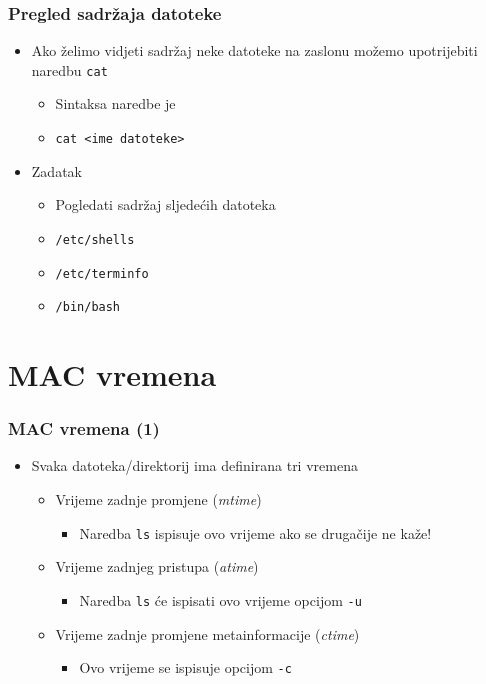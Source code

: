 \documentclass{beamer}
\newcommand{\shell}[1]{\texttt{#1}}
\begin{document}
\begin{frame}[t]
\frametitle{Pregled sadržaja datoteke}
\begin{itemize}
  \item Ako želimo vidjeti sadržaj neke datoteke na zaslonu možemo
        upotrijebiti naredbu \shell{cat}
  \begin{itemize}
    \item Sintaksa naredbe je 
    \item[] \shell{cat \textless ime datoteke\textgreater}
  \end{itemize}
  \item Zadatak
  \begin{itemize}
    \item Pogledati sadržaj sljedećih datoteka
    \item[] \shell{/etc/shells}
    \item[] \shell{/etc/terminfo}
    \item[] \shell{/bin/bash}
  \end{itemize}
\end{itemize}
\end{frame}

\section{MAC vremena}
\begin{frame}[t]
\frametitle{MAC vremena (1)}
\begin{itemize}
  \item Svaka datoteka/direktorij ima definirana tri vremena
  \begin{itemize}
    \item Vrijeme zadnje promjene (\emph{mtime})
    \begin{itemize}
      \item Naredba \shell{ls} ispisuje ovo vrijeme ako se drugačije 
               ne kaže!
    \end{itemize}
    \item Vrijeme zadnjeg pristupa (\emph{atime})
    \begin{itemize} 
      \item Naredba \shell{ls} će ispisati ovo vrijeme opcijom
            \shell{-u}
    \end{itemize}
    \item Vrijeme zadnje promjene metainformacije (\emph{ctime})
    \begin{itemize}
      \item Ovo vrijeme se ispisuje opcijom \shell{-c}
    \end{itemize}
  \end{itemize}
\end{itemize}
\end{frame}
\end{document}
